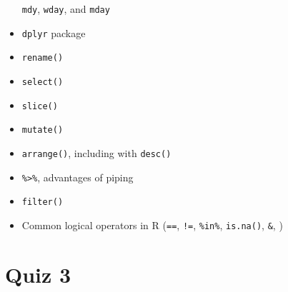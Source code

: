 \documentclass[]{book}
\theoremstyle{definition}
\theoremstyle{definition}
\theoremstyle{definition}
\theoremstyle{remark}
\begin{document}
\begin{itemize}
  \texttt{mdy}, \texttt{wday}, and \texttt{mday}
\item
  \texttt{dplyr} package
\item
  \texttt{rename()}
\item
  \texttt{select()}
\item
  \texttt{slice()}
\item
  \texttt{mutate()}
\item
  \texttt{arrange()}, including with \texttt{desc()}
\item
  \texttt{\%\textgreater{}\%}, advantages of piping
\item
  \texttt{filter()}
\item
  Common logical operators in R (\texttt{==}, \texttt{!=},
  \texttt{\%in\%}, \texttt{is.na()}, \texttt{\&}, \texttt{\textbar{}})
\end{itemize}

\section{Quiz 3}\label{quiz-3}
\end{document}
